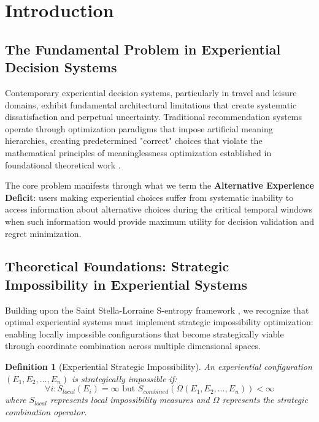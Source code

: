 \documentclass[12pt,a4paper]{article}
\newtheorem{definition}{Definition}
\begin{document}
\section{Introduction}

\subsection{The Fundamental Problem in Experiential Decision Systems}

Contemporary experiential decision systems, particularly in travel and leisure domains, exhibit fundamental architectural limitations that create systematic dissatisfaction and perpetual uncertainty. Traditional recommendation systems operate through optimization paradigms that impose artificial meaning hierarchies, creating predetermined "correct" choices that violate the mathematical principles of meaninglessness optimization established in foundational theoretical work \cite{sachikonye2024meaninglessness,sachikonye2024mathematical}.

The core problem manifests through what we term the \textbf{Alternative Experience Deficit}: users making experiential choices suffer from systematic inability to access information about alternative choices during the critical temporal windows when such information would provide maximum utility for decision validation and regret minimization.

\subsection{Theoretical Foundations: Strategic Impossibility in Experiential Systems}

Building upon the Saint Stella-Lorraine S-entropy framework \cite{sachikonye2024stella}, we recognize that optimal experiential systems must implement strategic impossibility optimization: enabling locally impossible configurations that become strategically viable through coordinate combination across multiple dimensional spaces.

\begin{definition}[Experiential Strategic Impossibility]
An experiential configuration $(E_1, E_2, \ldots, E_n)$ is strategically impossible if:
\begin{equation}
\forall i: S_{local}(E_i) = \infty \text{ but } S_{combined}(\Omega(E_1, E_2, \ldots, E_n)) < \infty
\end{equation}
where $S_{local}$ represents local impossibility measures and $\Omega$ represents the strategic combination operator.
\end{definition}
\end{document}
